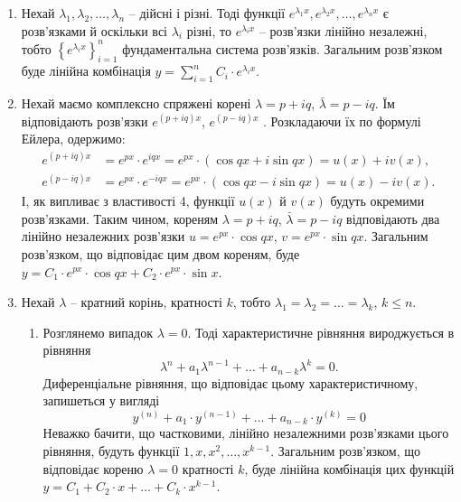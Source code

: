 \begin{enumerate}
\item Нехай $\lambda_1, \lambda_2, \ldots, \lambda_n$ -- дійсні і різні. Тоді функції $e^{\lambda_1 x}, e^{\lambda_2 x}, \ldots, e^{\lambda_n x}$ є розв'язками й оскільки всі $\lambda_i$ різні, то $e^{\lambda_i x}$ -- розв'язки лінійно незалежні, тобто $\left\{ e^{\lambda_i x} \right\}_{i = 1}^n$ фундаментальна система розв'язків. Загальним розв'язком буде лінійна комбінація $y = \sum_{i=1}^n C_i \cdot e^{\lambda_i x}$.
\item Нехай маємо комплексно спряжені корені $\lambda=p+iq$, $\bar\lambda=p-iq$. Їм відповідають розв'язки $e^{(p+iq)x}$, $e^{(p-iq)x}$ . Розкладаючи їх по формулі Ейлера, одержимо: 
\begin{align*}
	e^{(p+iq)x} &= e^{px} \cdot e^{iqx} = e^{px} \cdot (\cos qx + i \sin qx) = u(x) + i v(x), \\
	e^{(p-iq)x} &= e^{px} \cdot e^{-iqx} = e^{px} \cdot (\cos qx - i \sin qx) = u(x) - i v(x).
\end{align*}
І, як випливає з властивості 4, функції $u(x)$ й $v(x)$ будуть окремими розв'язками. Таким чином, кореням $\lambda = p + iq$, $\bar\lambda = p - iq$ відповідають два лінійно незалежних розв'язки $u = e^{px} \cdot \cos qx$, $v = e^{px} \cdot \sin qx$. Загальним розв'язком, що відповідає цим двом кореням, буде $y = C_1 \cdot e^{px} \cdot \cos qx + C_2 \cdot e^{px} \cdot \sin x$.
\item Нехай $\lambda$ -- кратний корінь, кратності $k$, тобто $\lambda_1 = \lambda_2 = \ldots = \lambda_k$, $k\le n$.
\begin{enumerate}
\item Розглянемо випадок $\lambda=0$. Тоді характеристичне рівняння вироджується в рівняння
\begin{equation*}
	\lambda^n + a_1 \lambda^{n - 1} + \ldots + a_{n - k} \lambda^k = 0.
\end{equation*}
 	Диференціальне рівняння, що відповідає цьому характеристичному, запишеться у вигляді
\begin{equation*}
	y^{(n)} + a_1 \cdot y^{(n - 1)} + \ldots + a_{n-k} \cdot y^{(k)} = 0
\end{equation*}
 	Неважко бачити, що частковими, лінійно незалежними роз\-в'я\-з\-ка\-ми цього рівняння, будуть функції $1, x, x^2, \ldots, x^{k-1}$. Загальним роз\-в'я\-з\-ком, що відповідає кореню $\lambda=0$ кратності $k$, буде лінійна комбінація цих функцій $y = C_1 + C_2 \cdot x + \ldots + C_k \cdot x^{k - 1}$.

\end{enumerate}
\end{enumerate}
